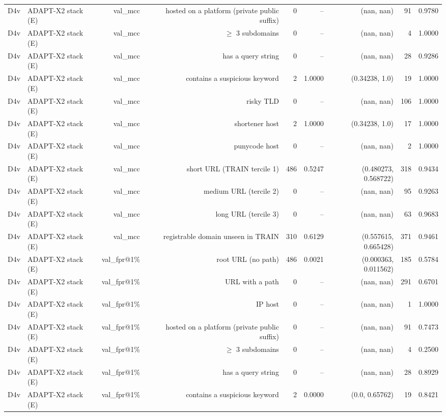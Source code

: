 \begin{table}[t]
\begin{tabular}{llrrrrrrr}
D4v & ADAPT-X2 stack (E) & val\_mcc & hosted on a platform (private public suffix) & 0 & -- & (nan, nan) & 91 & 0.9780 \\
D4v & ADAPT-X2 stack (E) & val\_mcc & $\geq$ 3 subdomains & 0 & -- & (nan, nan) & 4 & 1.0000 \\
D4v & ADAPT-X2 stack (E) & val\_mcc & has a query string & 0 & -- & (nan, nan) & 28 & 0.9286 \\
D4v & ADAPT-X2 stack (E) & val\_mcc & contains a suspicious keyword & 2 & 1.0000 & (0.34238, 1.0) & 19 & 1.0000 \\
D4v & ADAPT-X2 stack (E) & val\_mcc & risky TLD & 0 & -- & (nan, nan) & 106 & 1.0000 \\
D4v & ADAPT-X2 stack (E) & val\_mcc & shortener host & 2 & 1.0000 & (0.34238, 1.0) & 17 & 1.0000 \\
D4v & ADAPT-X2 stack (E) & val\_mcc & punycode host & 0 & -- & (nan, nan) & 2 & 1.0000 \\
D4v & ADAPT-X2 stack (E) & val\_mcc & short URL (TRAIN tercile 1) & 486 & 0.5247 & (0.480273, 0.568722) & 318 & 0.9434 \\
D4v & ADAPT-X2 stack (E) & val\_mcc & medium URL (tercile 2) & 0 & -- & (nan, nan) & 95 & 0.9263 \\
D4v & ADAPT-X2 stack (E) & val\_mcc & long URL (tercile 3) & 0 & -- & (nan, nan) & 63 & 0.9683 \\
D4v & ADAPT-X2 stack (E) & val\_mcc & registrable domain unseen in TRAIN & 310 & 0.6129 & (0.557615, 0.665428) & 371 & 0.9461 \\
D4v & ADAPT-X2 stack (E) & val\_fpr@1\% & root URL (no path) & 486 & 0.0021 & (0.000363, 0.011562) & 185 & 0.5784 \\
D4v & ADAPT-X2 stack (E) & val\_fpr@1\% & URL with a path & 0 & -- & (nan, nan) & 291 & 0.6701 \\
D4v & ADAPT-X2 stack (E) & val\_fpr@1\% & IP host & 0 & -- & (nan, nan) & 1 & 1.0000 \\
D4v & ADAPT-X2 stack (E) & val\_fpr@1\% & hosted on a platform (private public suffix) & 0 & -- & (nan, nan) & 91 & 0.7473 \\
D4v & ADAPT-X2 stack (E) & val\_fpr@1\% & $\geq$ 3 subdomains & 0 & -- & (nan, nan) & 4 & 0.2500 \\
D4v & ADAPT-X2 stack (E) & val\_fpr@1\% & has a query string & 0 & -- & (nan, nan) & 28 & 0.8929 \\
D4v & ADAPT-X2 stack (E) & val\_fpr@1\% & contains a suspicious keyword & 2 & 0.0000 & (0.0, 0.65762) & 19 & 0.8421 \\

\end{tabular}
\end{table}
